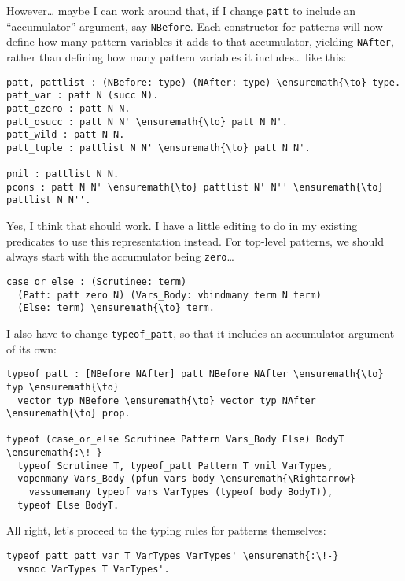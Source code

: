 However\ldots{} maybe I can work around that, if I change \texttt{patt}
to include an ``accumulator'' argument, say \texttt{NBefore}. Each
constructor for patterns will now define how many pattern variables it
adds to that accumulator, yielding \texttt{NAfter}, rather than defining
how many pattern variables it includes\ldots{} like this:

\begin{verbatim}
patt, pattlist : (NBefore: type) (NAfter: type) \ensuremath{\to} type.
patt_var : patt N (succ N).
patt_ozero : patt N N.
patt_osucc : patt N N' \ensuremath{\to} patt N N'.
patt_wild : patt N N.
patt_tuple : pattlist N N' \ensuremath{\to} patt N N'.

pnil : pattlist N N.
pcons : patt N N' \ensuremath{\to} pattlist N' N'' \ensuremath{\to} pattlist N N''.
\end{verbatim}

Yes, I think that should work. I have a little editing to do in my
existing predicates to use this representation instead. For top-level
patterns, we should always start with the accumulator being
\texttt{zero}\ldots{}

\begin{verbatim}
case_or_else : (Scrutinee: term)
  (Patt: patt zero N) (Vars_Body: vbindmany term N term)
  (Else: term) \ensuremath{\to} term.
\end{verbatim}

I also have to change \texttt{typeof\_patt}, so that it includes an
accumulator argument of its own:

\begin{verbatim}
typeof_patt : [NBefore NAfter] patt NBefore NAfter \ensuremath{\to} typ \ensuremath{\to}
  vector typ NBefore \ensuremath{\to} vector typ NAfter \ensuremath{\to} prop.

typeof (case_or_else Scrutinee Pattern Vars_Body Else) BodyT \ensuremath{:\!-}
  typeof Scrutinee T, typeof_patt Pattern T vnil VarTypes,
  vopenmany Vars_Body (pfun vars body \ensuremath{\Rightarrow}
    vassumemany typeof vars VarTypes (typeof body BodyT)),
  typeof Else BodyT.
\end{verbatim}

All right, let's proceed to the typing rules for patterns themselves:

\begin{verbatim}
typeof_patt patt_var T VarTypes VarTypes' \ensuremath{:\!-}
  vsnoc VarTypes T VarTypes'.
\end{verbatim}

